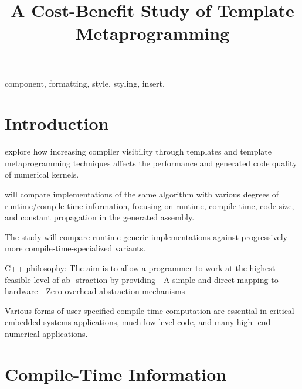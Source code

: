 \documentclass[conference]{IEEEtran}
\begin{document}
\title{A Cost-Benefit Study of Template Metaprogramming}

\author{
}

\maketitle

\begin{abstract}
\end{abstract}

\begin{IEEEkeywords}
component, formatting, style, styling, insert.
\end{IEEEkeywords}

\section{Introduction}
explore how increasing compiler visibility
through templates and template metaprogramming techniques affects the
performance and generated code quality of numerical kernels.

will compare implementations of the same algorithm with various degrees of
runtime/compile time information, focusing on runtime, compile time, code size,
and constant propagation in the generated assembly.

The study will compare runtime-generic implementations against progressively
more compile-time-specialized variants.

C++ philosophy:
The aim is to allow a programmer to work at the highest feasible level of ab-
straction by providing
- A simple and direct mapping to hardware
- Zero-overhead abstraction mechanisms

Various forms of user-specified compile-time computation are essential in
critical embedded systems applications, much low-level code, and many high-
end numerical applications.
\cite[p.~6]{stroustrup_foundations_2011}

\section{Compile-Time Information}
\end{document}
